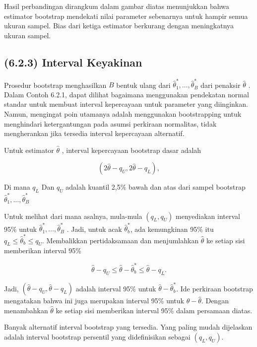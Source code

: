 \documentclass[
]{book}
\begin{document}
Hasil perbandingan dirangkum dalam gambar diatas menunjukkan bahwa estimator bootstrap mendekati nilai parameter sebenarnya untuk hampir semua ukuran sampel. Bias dari ketiga estimator berkurang dengan meningkatnya ukuran sampel.

\hypertarget{interval-keyakinan}{%
\subsection{(6.2.3) Interval Keyakinan}\label{interval-keyakinan}}

Prosedur bootstrap menghasilkan \(B\) bentuk ulang dari \(\hat{\theta}_1^*, \ldots,\hat{\theta}_B^*\) dari penaksir \(\hat{\theta}\) . Dalam Contoh 6.2.1, dapat dilihat bagaimana menggunakan pendekatan normal standar untuk membuat interval kepercayaan untuk parameter yang diinginkan. Namun, mengingat poin utamanya adalah menggunakan bootstrapping untuk menghindari ketergantungan pada asumsi perkiraan normalitas, tidak mengherankan jika tersedia interval kepercayaan alternatif.

Untuk estimator \(\hat{\theta}\) , interval kepercayaan bootstrap dasar adalah

\[\begin{equation} 
  \left(2 \hat{\theta} - q_U, 2 \hat{\theta} - q_L \right) ,
\tag{6.2}
\end{equation}\]

Di mana \(q_L\) Dan \(q_U\) adalah kuantil 2,5\% bawah dan atas dari sampel bootstrap \(\hat{\theta}_1^*, \ldots,\hat{\theta}_B^*\)

Untuk melihat dari mana asalnya, mula-mula \((q_L, q_U)\) menyediakan interval 95\% untuk \(\hat{\theta}_1^*, \ldots,\hat{\theta}_B^*\) . Jadi, untuk acak \(\hat{\theta}_b^*\), ada kemungkinan 95\% itu \(q_L \le \hat{\theta}_b^* \le q_U\). Membalikkan pertidaksamaan dan menjumlahkan \(\hat{\theta}\) ke setiap sisi memberikan interval 95\%

\[\hat{\theta} -q_U \le \hat{\theta} - \hat{\theta}_b^* \le  \hat{\theta} -q_L .\]

Jadi, \(\left( \hat{\theta}-q_U, \hat{\theta} -q_L\right)\) adalah interval 95\% untuk \(\hat{\theta} - \hat{\theta}_b^*\). Ide perkiraan bootstrap mengatakan bahwa ini juga merupakan interval 95\% untuk \(\theta - \hat{\theta}\). Dengan menambahkan \(\hat{\theta}\) ke setiap sisi memberikan interval 95\% dalam persamaan diatas.

Banyak alternatif interval bootstrap yang tersedia. Yang paling mudah dijelaskan adalah interval bootstrap persentil yang didefinisikan sebagai \((q_L,q_U)\).
\end{document}
